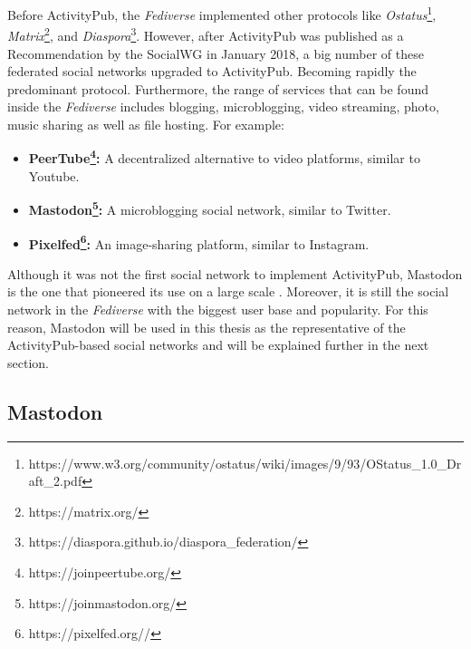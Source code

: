 Before ActivityPub, the \emph{Fediverse} implemented other protocols like \emph{Ostatus}\footnote{https://www.w3.org/community/ostatus/wiki/images/9/93/OStatus\_1.0\_Draft\_2.pdf}, \emph{Matrix}\footnote{https://matrix.org/}, and \emph{Diaspora}\footnote{https://diaspora.github.io/diaspora\_federation/}. However, after ActivityPub was published as a Recommendation by the SocialWG in January 2018, a big number of these federated social networks upgraded to ActivityPub. Becoming rapidly the predominant protocol. Furthermore, the range of services that can be found inside the \emph{Fediverse} includes blogging, microblogging, video streaming, photo, music sharing as well as file hosting. For example: 

\begin{itemize}
  \item \textbf{PeerTube\footnote{https://joinpeertube.org/}:} A decentralized alternative to video platforms, similar to Youtube.
  \item \textbf{Mastodon\footnote{https://joinmastodon.org/}:} A microblogging social network, similar to Twitter. 
  \item \textbf{Pixelfed\footnote{https://pixelfed.org//}:} An image-sharing platform, similar to Instagram. 
\end{itemize} 

Although it was not the first social network to implement ActivityPub, Mastodon is the one that pioneered its use on a large scale \cite{lemmer-webber_2017}. Moreover, it is still the social network in the \emph{Fediverse} with the biggest user base and popularity. For this reason, Mastodon will be used in this thesis as the representative of the ActivityPub-based social networks and will be explained further in the next section. 

\subsection{Mastodon}\label{subsec:mastodon}

